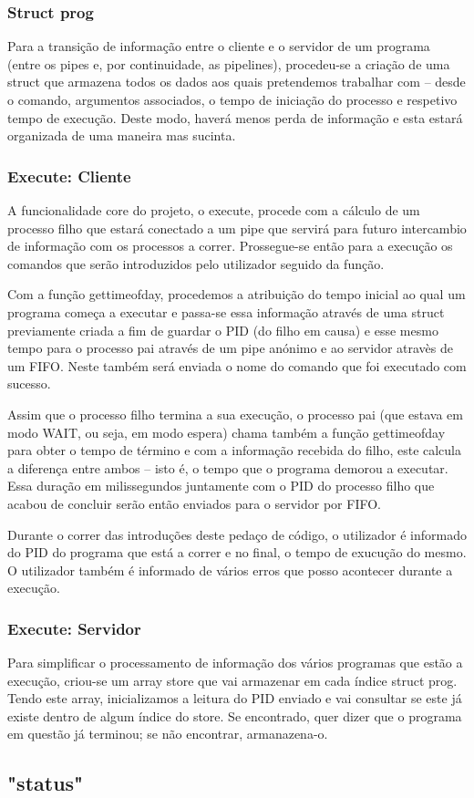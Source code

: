 \documentclass{report}
\begin{document}
\subsubsection{Struct prog}

Para a transição de informação entre o cliente e o servidor de um programa (entre os pipes e, por continuidade, as pipelines), procedeu-se a criação de uma struct que armazena todos os dados aos quais pretendemos trabalhar com – desde o comando, argumentos associados, o tempo de iniciação do processo e respetivo tempo de execução. Deste modo, haverá menos perda de informação e esta estará organizada de uma maneira mas sucinta.

\subsubsection{Execute: Cliente}

A funcionalidade core do projeto, o execute, procede com a cálculo de um processo filho que estará conectado a um pipe que servirá para futuro intercambio de informação com os processos a correr. Prossegue-se então para a execução os comandos que serão introduzidos pelo utilizador seguido da função.

Com a função gettimeofday, procedemos a atribuição do tempo inicial ao qual um programa começa a executar e passa-se essa informação através de uma struct previamente criada a fim de guardar o PID (do filho em causa) e esse mesmo tempo para o processo pai através de um pipe anónimo e ao servidor atravès de um FIFO. Neste também será enviada o nome do comando que foi executado com sucesso.

Assim que o processo filho termina a sua execução, o processo pai (que estava em modo WAIT, ou seja, em modo espera) chama também a função gettimeofday para obter o tempo de término e com a informação recebida do filho, este calcula a diferença entre ambos – isto é, o tempo que o programa demorou a executar. Essa duração em milissegundos juntamente com o PID do processo filho que acabou de concluir serão então enviados para o servidor por FIFO.

Durante o correr das introduções deste pedaço de código, o utilizador é informado do PID do programa que está a correr e no final, o tempo de exucução do mesmo. O utilizador também é informado de vários erros que posso acontecer durante a execução.

\subsubsection{Execute: Servidor}

Para simplificar o processamento de informação dos vários programas que estão a execução, criou-se um array store que vai armazenar em cada índice struct prog. Tendo este array, inicializamos a leitura do PID enviado e vai consultar se este já existe dentro de algum índice do store. Se encontrado, quer dizer que o programa em questão já terminou; se não encontrar, armanazena-o.

\subsection{"status"}
\end{document}
